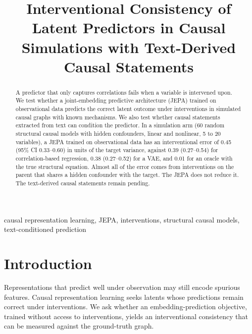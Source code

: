 \documentclass[conference]{IEEEtran}
\begin{document}
\title{Interventional Consistency of Latent Predictors in Causal Simulations with Text-Derived Causal Statements}

\author{
}

\maketitle

\begin{abstract}
A predictor that only captures correlations fails when a variable is intervened upon. We test whether a joint-embedding predictive architecture (JEPA) trained on observational data predicts the correct latent outcome under interventions in simulated causal graphs with known mechanisms. We also test whether causal statements extracted from text can condition the predictor. In a simulation arm (60 random structural causal models with hidden confounders, linear and nonlinear, 5 to 20 variables), a JEPA trained on observational data has an interventional error of 0.45 (95\% CI 0.33--0.60) in units of the target variance, against 0.39 (0.27--0.54) for correlation-based regression, 0.38 (0.27--0.52) for a VAE, and 0.01 for an oracle with the true structural equation. Almost all of the error comes from interventions on the parent that shares a hidden confounder with the target. The JEPA does not reduce it. The text-derived causal statements remain pending.
\end{abstract}

\begin{IEEEkeywords}
causal representation learning, JEPA, interventions, structural causal models, text-conditioned prediction
\end{IEEEkeywords}

\section{Introduction}
Representations that predict well under observation may still encode spurious features. Causal representation learning seeks latents whose predictions remain correct under interventions. We ask whether an embedding-prediction objective, trained without access to interventions, yields an interventional consistency that can be measured against the ground-truth graph.
\end{document}

